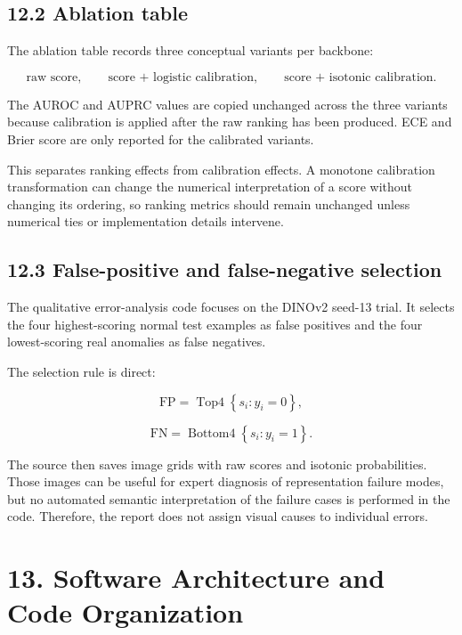 \documentclass[
  11pt,
]{article}
\begin{document}
\subsection{12.2 Ablation table}\label{ablation-table}

The ablation table records three conceptual variants per backbone:

\[
\text{raw score},
\qquad
\text{score + logistic calibration},
\qquad
\text{score + isotonic calibration}.
\]

The AUROC and AUPRC values are copied unchanged across the three
variants because calibration is applied after the raw ranking has been
produced. ECE and Brier score are only reported for the calibrated
variants.

This separates ranking effects from calibration effects. A monotone
calibration transformation can change the numerical interpretation of a score without changing its ordering,
so ranking metrics should remain unchanged unless numerical ties or
implementation details intervene.

\subsection{12.3 False-positive and false-negative
selection}\label{false-positive-and-false-negative-selection}

The qualitative error-analysis code focuses on the DINOv2 seed-13 trial.
It selects the four highest-scoring normal test examples as false
positives and the four lowest-scoring real anomalies as false negatives.

The selection rule is direct:

\[
\text{FP}
=
\operatorname{Top4}
\left\{
s_i:y_i=0
\right\},
\]

\[
\text{FN}
=
\operatorname{Bottom4}
\left\{
s_i:y_i=1
\right\}.
\]

The source then saves image grids with raw scores and isotonic
probabilities. Those images can be useful for expert diagnosis of
representation failure modes, but no automated semantic interpretation
of the failure cases is performed in the code. Therefore, the report
does not assign visual causes to individual errors.

\section{13. Software Architecture and Code
Organization}\label{software-architecture-and-code-organization}
\end{document}
